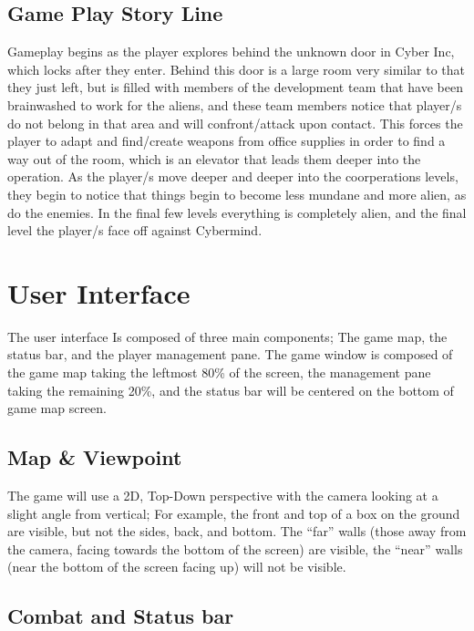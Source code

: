 \documentclass[11pt]{article}
\begin{document}
        \subsection{Game Play Story Line}
            Gameplay begins as the player explores behind the unknown door in Cyber Inc, which locks after they enter. Behind this door is a large room very similar to that they just left, but is filled with members of the development team that have been brainwashed to work for the aliens, and these team members notice that player/s do not belong in that area and will confront/attack upon contact. This forces the player to adapt and find/create weapons from office supplies in order to find a way out of the room, which is an elevator that leads them deeper into the operation. As the player/s move deeper and deeper into the coorperations levels, they begin to notice that things begin to become less mundane and more alien, as do the enemies. In the final few levels everything is completely alien, and the final level the player/s face off against Cybermind. 
        
    

    \section{}

    \section{User Interface}
        The user interface Is composed of three main components; The game map, the status bar, and the player management pane.
	The game window is composed of the game map taking the leftmost 80\% of the screen, the management pane taking the remaining 20\%, and the status bar will be centered on the bottom of game map screen.

	\subsection{Map \& Viewpoint}
	The game will use a 2D, Top-Down perspective with the camera looking at a slight angle from vertical; For example, the front and top of a box on the ground are visible, but not the sides, back, and bottom.
	The ``far'' walls (those away from the camera, facing towards the bottom of the screen) are visible, the ``near'' walls (near the bottom of the screen facing up) will not be visible.

	\subsection{Combat and Status bar}
\end{document}
